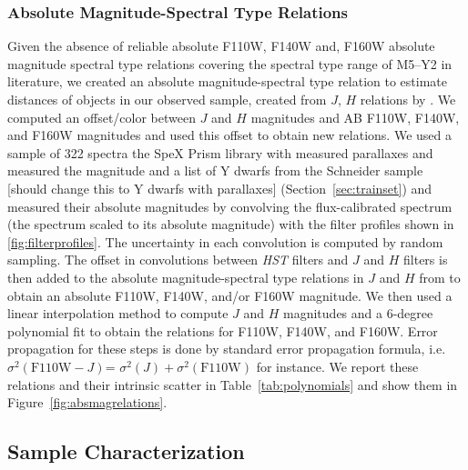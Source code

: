\documentclass[manuscript]{aastex63}
\begin{document}
\subsubsection{ Absolute Magnitude-Spectral Type Relations }\label{sec:absmags}
Given the absence of reliable absolute F110W, F140W and, F160W absolute magnitude spectral type relations covering the spectral type range of M5--Y2 in literature, we created an absolute magnitude-spectral type relation to estimate distances of objects in our observed sample, created from $J$, $H$ relations by \cite{Pecaut2013}. We computed an offset/color between $J$ and $H$ magnitudes and AB F110W, F140W, and F160W magnitudes and used this offset to obtain new relations. We used a sample of 322 spectra the SpeX Prism library with measured parallaxes and measured the magnitude and a list of Y dwarfs from the Schneider sample [should change this to Y dwarfs with parallaxes] (Section~\ref{sec:trainset}) and measured their absolute magnitudes by convolving the flux-calibrated spectrum (the spectrum scaled to its absolute magnitude) with the filter profiles shown in \ref{fig:filterprofiles}.  The uncertainty in each convolution is computed by random sampling. The offset in convolutions between \textit{HST} filters and $J$ and $H$ filters is then added to the absolute magnitude-spectral type relations in $J$ and $H$ from \cite{Pecaut2013} to obtain an absolute F110W, F140W, and/or F160W magnitude. We then used a linear interpolation method to compute $J$ and $H$ magnitudes and a 6-degree polynomial fit to obtain the relations for F110W, F140W, and F160W. Error propagation for these steps is done by standard error propagation formula, i.e. $\sigma ^2 (\mathrm{F110W}-J)$= $\sigma ^2 (J) + \sigma ^2 (\mathrm{F110W})$ for instance. We report these relations and their intrinsic scatter in Table~\ref{tab:polynomials} and show them in Figure~\ref{fig:absmagrelations}.


\subsection{Sample Characterization}\label{sec:results}
\end{document}
